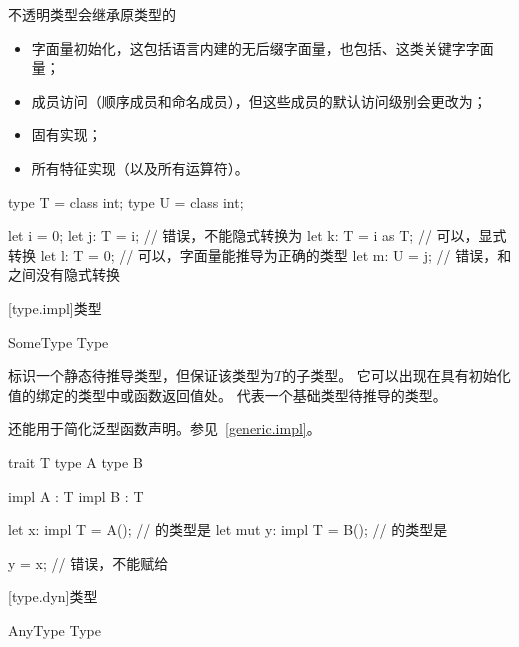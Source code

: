 \pnum
不透明类型会继承原类型的
\begin{itemize}
    \item 字面量初始化，这包括语言内建的无后缀字面量，也包括、这类关键字字面量；
    \item 成员访问（顺序成员和命名成员），但这些成员的默认访问级别会更改为；
    \item 固有实现；
    \item 所有特征实现（以及所有运算符）。
\end{itemize}

\enterexample
\begin{codeblock}

type T = class int;
type U = class int;

let i = 0;
let j: T = i; // 错误，不能隐式转换为
let k: T = i as T; // 可以，显式转换
let l: T = 0; // 可以，字面量能推导为正确的类型
let m: U = j; // 错误，和之间没有隐式转换

\end{codeblock}
\exitexample

[type.impl]{类型}

\begin{bnf}{SomeType}
     Type \br
     \terminal{_}
\end{bnf}

\pnum
{}标识一个静态待推导类型，但保证该类型为$T$的子类型。
它可以出现在具有初始化值的绑定的类型中或函数返回值处。
代表一个基础类型待推导的类型。

\pnum
{}还能用于简化泛型函数声明。参见~\ref{generic.impl}。

\enterexample
\begin{codeblock}

trait T { }
type A { }
type B { }

impl A : T { }
impl B : T { }

let x: impl T = A(); // 的类型是
let mut y: impl T = B(); // 的类型是

y = x; // 错误，不能赋给

\end{codeblock}
\exitexample

[type.dyn]{类型}

\begin{bnf}{AnyType}
     Type \br
     \terminal{_} \br
\end{bnf}

